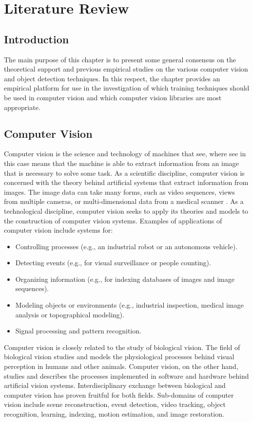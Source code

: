 \chapter{Literature Review}

\section{Introduction}
The main purpose of this chapter is to present some general consensus on the theoretical support and previous empirical studies on the various computer vision and object detection techniques. In this respect, the chapter provides an empirical platform for use in the investigation of which training techniques should be used in computer vision and which computer vision libraries are most appropriate.

\section{Computer Vision}
Computer vision is the science and technology of machines that see, where see in this case means that the machine is able to extract information from an image that is necessary to solve some task. As a scientific discipline, computer vision is concerned with the theory behind artificial systems that extract information from images. The image data can take many forms, such as video sequences, views from multiple cameras, or multi-dimensional data from a medical scanner \cite{forbes}.
As a technological discipline, computer vision seeks to apply its theories and models to the construction of computer vision systems. Examples of applications of computer vision include systems for:
\begin{itemize}
\item Controlling processes (e.g., an industrial robot or an autonomous vehicle).
\item Detecting events (e.g., for visual surveillance or people counting).
\item Organizing information (e.g., for indexing databases of images and image sequences).
\item Modeling objects or environments (e.g., industrial inspection, medical image analysis or topographical modeling).
\item Signal processing and pattern recognition.
\end{itemize}
Computer vision is closely related to the study of biological vision. The field of biological vision studies and models the physiological processes behind visual perception in humans and other animals. Computer vision, on the other hand, studies and describes the processes implemented in software and hardware behind artificial vision systems. Interdisciplinary exchange between biological and computer vision has proven fruitful for both fields. Sub-domains of computer vision include scene reconstruction, event detection, video tracking, object recognition, learning, indexing, motion estimation, and image restoration.

